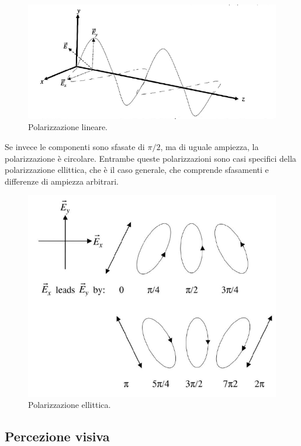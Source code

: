 \documentclass[a4paper,11pt]{article}
\begin{document}
\renewcommand{\thefigure}{2.3}
\begin{figure}[!h]
  \centering
    \includegraphics[scale=0.6]{images/2/linear_polarization.png}
    \caption{Polarizzazione lineare.}
\end{figure}

Se invece le componenti sono sfasate di $\pi /2$, ma di uguale ampiezza, la polarizzazione è circolare.
Entrambe queste polarizzazioni sono casi specifici della polarizzazione ellittica,
che è il caso generale, che comprende sfasamenti e differenze di ampiezza arbitrari.

\renewcommand{\thefigure}{2.4}
\begin{figure}[!h]
  \centering
    \includegraphics[scale=0.6]{images/2/elliptic_polarization.png}
    \caption{Polarizzazione ellittica.}
\end{figure}

\subsection{Percezione visiva}
\end{document}
